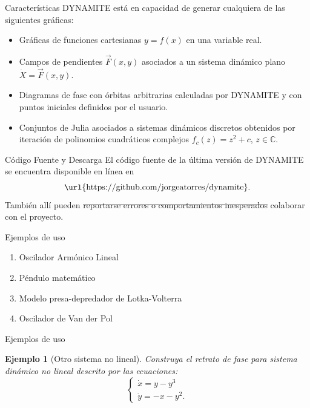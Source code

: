 \documentclass{beamer}
\newtheorem{exa}{Ejemplo}
\renewenvironment{example}{\begin{exa}}{\end{exa}}
\newcommand{\C}{{\ensuremath{\mathbb{C}}}}
\begin{document}
\begin{frame}{Características}
	DYNAMITE está en capacidad de generar cualquiera de las siguientes gráficas:
	
	\begin{itemize}
		\pause
		\item Gráficas de funciones cartesianas $y = f(x)$ en una variable real.
		\pause
		\item Campos de pendientes $\vec{F}(x,y)$ asociados a un sistema dinámico plano $\dot{X} = \vec{F}(x,y)$.
		\pause
		\item Diagramas de fase con órbitas arbitrarias calculadas por DYNAMITE y con puntos iniciales definidos por el usuario.
		\pause
		\item Conjuntos de Julia asociados a sistemas dinámicos discretos obtenidos por iteración de polinomios cuadráticos complejos $f_c(z) = z^2 + c$, $z \in \C$.
	\end{itemize}
\end{frame}

\begin{frame}{Código Fuente y Descarga}
El código fuente de la última versión de DYNAMITE se encuentra disponible en línea en
$$ \text{\url{https://github.com/jorgeatorres/dynamite}}. $$
\pause
También allí pueden \sout{reportarse errores o comportamientos inesperados} colaborar con el proyecto.
\end{frame}

\begin{frame}{Ejemplos de uso}
\begin{enumerate}
\item Oscilador Armónico Lineal
\item Péndulo matemático
\item Modelo presa-depredador de Lotka-Volterra
\item Oscilador de Van der Pol
\end{enumerate}
\end{frame}

\begin{frame}{Ejemplos de uso}
\begin{example}[Otro sistema no lineal]
Construya el retrato de fase para sistema dinámico no lineal descrito por las ecuaciones:
$$
\left \{
	\begin{array}{ll}
		\dot{x} = y - y^3 \\
		\dot{y} = -x - y^2.
	\end{array} \right.
$$
\end{example}
\end{frame}
\end{document}
